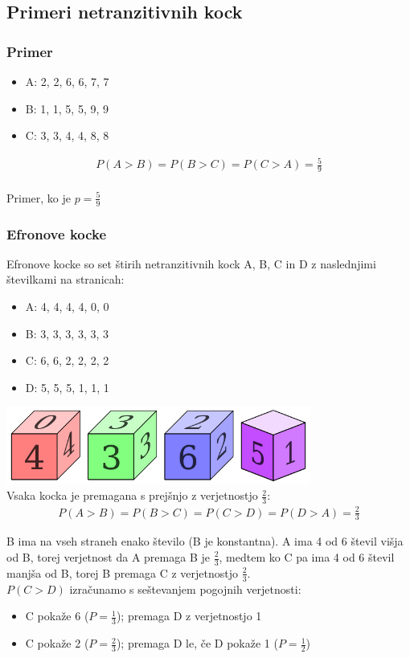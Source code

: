 \documentclass[12pt,a4paper]{amsart}
\begin{document}
\subsection{Primeri netranzitivnih kock}

\subsubsection{Primer}
\begin{itemize}
    \item A: 2, 2, 6, 6, 7, 7
    \item B: 1, 1, 5, 5, 9, 9
    \item C: 3, 3, 4, 4, 8, 8
\end{itemize}
\begin{align*}
    P(A > B) = P(B > C) = P(C > A) = \frac{5}{9}
\end{align*}
\\Primer, ko je $p=\frac{5}{9}$

\subsubsection{Efronove kocke}
Efronove kocke so set štirih netranzitivnih kock A, B, C in D z naslednjimi številkami na stranicah:
\begin{itemize}
    \item A: 4, 4, 4, 4, 0, 0
    \item B: 3, 3, 3, 3, 3, 3
    \item C: 6, 6, 2, 2, 2, 2
    \item D: 5, 5, 5, 1, 1, 1
\end{itemize}
\includegraphics[width=100mm]{Efron's dice.png}
\\Vsaka kocka je premagana s prejšnjo z verjetnostjo $\frac{2}{3}$:
\begin{align*}
   P(A>B) = P(B>C) = P(C>D) = P(D>A) = \frac{2}{3}
\end{align*}
 
B ima na vseh straneh enako število (B je konstantna). A ima 4 od 6 števil višja od B, torej verjetnost da A premaga B je $\frac{2}{3}$, medtem ko
C pa ima 4 od 6 števil manjša od B, torej B premaga C z verjetnostjo $\frac{2}{3}$.
\\$P(C>D)$ izračunamo s seštevanjem pogojnih verjetnosti:
\begin{itemize}
    \item C pokaže 6 ($P = \frac{1}{3}$); premaga D z verjetnostjo 1
    \item C pokaže 2 ($P = \frac{2}{3}$); premaga D le, če D pokaže 1 ($P = \frac{1}{2}$)
\end{itemize}
\end{document}
